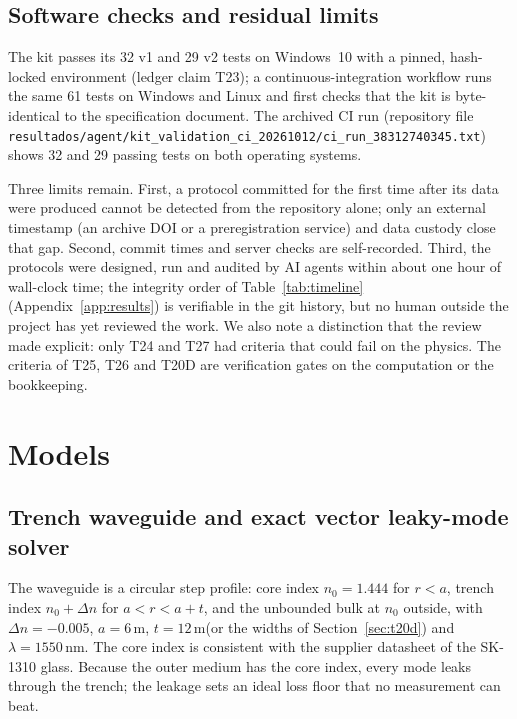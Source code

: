 \documentclass[11pt,a4paper]{article}
\newcommand{\um}{\,\textmu m\xspace}
\begin{document}
\subsection{Software checks and residual limits}

The kit passes its 32 v1 and 29 v2 tests on Windows~10 with a pinned, hash-locked environment (ledger claim T23); a continuous-integration workflow runs the same 61 tests on Windows and Linux and first checks that the kit is byte-identical to the specification document. The archived CI run (repository file \texttt{resultados/agent/kit\_validation\_ci\_20261012/ci\_run\_38312740345.txt}) shows 32 and 29 passing tests on both operating systems.

Three limits remain. First, a protocol committed for the first time after its data were produced cannot be detected from the repository alone; only an external timestamp (an archive DOI or a preregistration service) and data custody close that gap. Second, commit times and server checks are self-recorded. Third, the protocols were designed, run and audited by AI agents within about one hour of wall-clock time; the integrity order of Table~\ref{tab:timeline} (Appendix~\ref{app:results}) is verifiable in the git history, but no human outside the project has yet reviewed the work. We also note a distinction that the review made explicit: only T24 and T27 had criteria that could fail on the physics. The criteria of T25, T26 and T20D are verification gates on the computation or the bookkeeping.

\section{Models}
\label{sec:models}

\subsection{Trench waveguide and exact vector leaky-mode solver}
\label{sec:wgmodel}

The waveguide is a circular step profile: core index $n_0=1.444$ for $r<a$, trench index $n_0+\Delta n$ for $a<r<a+t$, and the unbounded bulk at $n_0$ outside, with $\Delta n=-0.005$, $a=6$\um, $t=12$\um (or the widths of Section~\ref{sec:t20d}) and $\lambda=1550$\,nm. The core index is consistent with the supplier datasheet of the SK-1310 glass. Because the outer medium has the core index, every mode leaks through the trench; the leakage sets an ideal loss floor that no measurement can beat.
\end{document}
